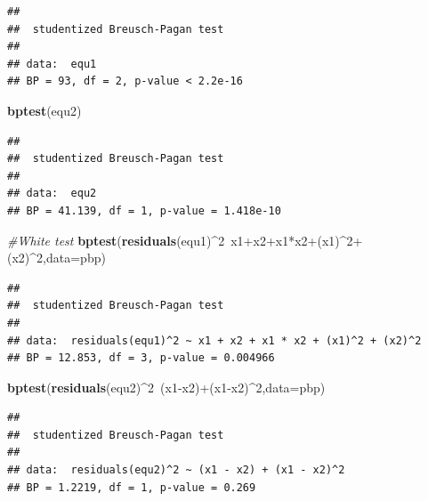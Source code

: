 \documentclass[]{article}
\newenvironment{Shaded}{\begin{snugshade}}{\end{snugshade}}
\newcommand{\KeywordTok}[1]{\textcolor[rgb]{0.13,0.29,0.53}{\textbf{{#1}}}}
\newcommand{\DataTypeTok}[1]{\textcolor[rgb]{0.13,0.29,0.53}{{#1}}}
\newcommand{\DecValTok}[1]{\textcolor[rgb]{0.00,0.00,0.81}{{#1}}}
\newcommand{\CommentTok}[1]{\textcolor[rgb]{0.56,0.35,0.01}{\textit{{#1}}}}
\newcommand{\NormalTok}[1]{{#1}}
\begin{document}
\begin{verbatim}
## 
##  studentized Breusch-Pagan test
## 
## data:  equ1
## BP = 93, df = 2, p-value < 2.2e-16
\end{verbatim}

\begin{Shaded}
\begin{Highlighting}[]
\KeywordTok{bptest}\NormalTok{(equ2)}
\end{Highlighting}
\end{Shaded}

\begin{verbatim}
## 
##  studentized Breusch-Pagan test
## 
## data:  equ2
## BP = 41.139, df = 1, p-value = 1.418e-10
\end{verbatim}

\begin{Shaded}
\begin{Highlighting}[]
\CommentTok{#White test}
\KeywordTok{bptest}\NormalTok{(}\KeywordTok{residuals}\NormalTok{(equ1)^}\DecValTok{2}\NormalTok{~x1+x2+x1*x2+(x1)^}\DecValTok{2}\NormalTok{+(x2)^}\DecValTok{2}\NormalTok{,}\DataTypeTok{data=}\NormalTok{pbp)}
\end{Highlighting}
\end{Shaded}

\begin{verbatim}
## 
##  studentized Breusch-Pagan test
## 
## data:  residuals(equ1)^2 ~ x1 + x2 + x1 * x2 + (x1)^2 + (x2)^2
## BP = 12.853, df = 3, p-value = 0.004966
\end{verbatim}

\begin{Shaded}
\begin{Highlighting}[]
\KeywordTok{bptest}\NormalTok{(}\KeywordTok{residuals}\NormalTok{(equ2)^}\DecValTok{2}\NormalTok{~(x1-x2)+(x1-x2)^}\DecValTok{2}\NormalTok{,}\DataTypeTok{data=}\NormalTok{pbp)}
\end{Highlighting}
\end{Shaded}

\begin{verbatim}
## 
##  studentized Breusch-Pagan test
## 
## data:  residuals(equ2)^2 ~ (x1 - x2) + (x1 - x2)^2
## BP = 1.2219, df = 1, p-value = 0.269
\end{verbatim}
\end{document}
